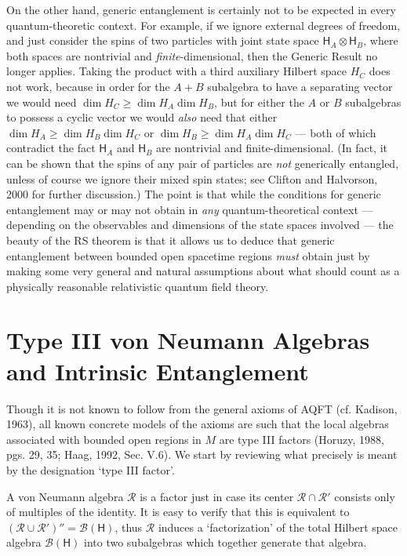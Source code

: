 \documentclass[12pt]{article}
\newcommand{\alg}[1]{\mbox{$\mathcal{#1}$}}
\newcommand{\hil}[1]{\mbox{$\mathsf{#1}$}}
\begin{document}
On the other hand, generic entanglement is certainly not to be expected in every 
quantum-theoretic context.  For example, if we ignore external degrees of freedom, and 
just consider the spins of two particles with joint state space 
$\hil{H}_{A}\otimes\hil{H}_{B}$, where both 
spaces are nontrivial and \emph{finite}-dimensional,  
then the Generic Result no longer applies.  Taking the product with a 
third auxiliary Hilbert space $H_{C}$ does not work, because in order 
for the $A+B$ subalgebra to have a separating vector we would need 
$\dim H_{C}\geq \dim H_{A}\dim H_{B}$, but for either the $A$ or $B$ subalgebras 
to possess a cyclic vector we would \emph{also} need that either 
$\dim H_{A}\geq \dim H_{B}\dim H_{C}$ or 
$\dim H_{B}\geq \dim H_{A}\dim H_{C}$ --- both of which contradict the 
fact  $\hil{H}_{A}$ and $\hil{H}_{B}$ are nontrivial and 
finite-dimensional.    
(In fact, it can be shown 
that the spins of any pair of particles are \emph{not} generically 
entangled, unless of course we ignore their mixed spin states; see Clifton and 
Halvorson, 2000 for further discussion.)  
The point is that while the conditions for 
generic entanglement may or 
may not obtain in \emph{any} quantum-theoretical context --- depending 
on the observables and dimensions of the state spaces involved --- the 
beauty of the RS theorem is that it allows us to deduce that generic 
entanglement between bounded open spacetime regions 
\emph{must} obtain just by making some very general and natural 
assumptions about what should count as a 
physically reasonable relativistic quantum field theory.

\section{Type III von Neumann Algebras and Intrinsic Entanglement}

 Though it is not known to follow from the general axioms of AQFT 
 (cf. Kadison, 
 1963), all known concrete 
 models of the axioms are such that the local algebras associated with 
 bounded open regions in $M$ are type 
 III factors (Horuzy, 1988, pgs. 29, 35; Haag, 1992, Sec. V.6).  We start 
  by reviewing 
 what precisely is meant by the designation `type III factor'.
 
 A von Neumann algebra $\alg{R}$ is a factor just in case its center 
 $\alg{R}\cap\alg{R}'$ consists only of multiples of the identity.  
 It is easy to verify that this is equivalent to 
 $(\alg{R}\cup\alg{R}')''=\alg{B}(\hil{H})$, thus $\alg{R}$ induces a 
 `factorization' of
 the total Hilbert space algebra $\alg{B}(\hil{H})$ into two subalgebras which together 
 generate that algebra.  
\end{document}
